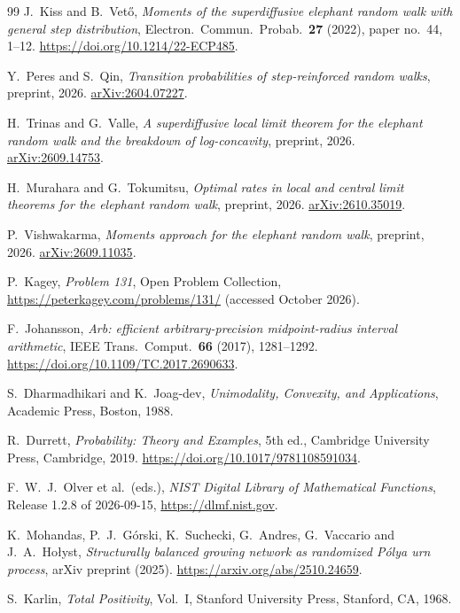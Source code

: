 \begin{thebibliography}{99}
J.~Kiss and B.~Vet\H{o}, \emph{Moments of the superdiffusive elephant
random walk with general step distribution}, Electron.\ Commun.\ Probab.\
\textbf{27} (2022), paper no.~44, 1--12.
\url{https://doi.org/10.1214/22-ECP485}.

Y.~Peres and S.~Qin, \emph{Transition probabilities of step-reinforced
random walks}, preprint, 2026.
\href{https://arxiv.org/abs/2604.07227}{arXiv:2604.07227}.

H.~Trinas and G.~Valle, \emph{A superdiffusive local limit theorem for the
elephant random walk and the breakdown of log-concavity}, preprint, 2026.
\href{https://arxiv.org/abs/2609.14753}{arXiv:2609.14753}.

H.~Murahara and G.~Tokumitsu, \emph{Optimal rates in local and central limit
theorems for the elephant random walk}, preprint, 2026.
\href{https://arxiv.org/abs/2610.35019}{arXiv:2610.35019}.

P.~Vishwakarma, \emph{Moments approach for the elephant random walk},
preprint, 2026.
\href{https://arxiv.org/abs/2609.11035}{arXiv:2609.11035}.

P.~Kagey, \emph{Problem 131}, Open Problem Collection,
\url{https://peterkagey.com/problems/131/} (accessed October 2026).

F.~Johansson, \emph{Arb: efficient arbitrary-precision midpoint-radius
interval arithmetic}, IEEE Trans.\ Comput.\ \textbf{66} (2017), 1281--1292.
\url{https://doi.org/10.1109/TC.2017.2690633}.

S.~Dharmadhikari and K.~Joag-dev, \emph{Unimodality, Convexity, and
Applications}, Academic Press, Boston, 1988.

R.~Durrett, \emph{Probability: Theory and Examples}, 5th ed., Cambridge University
Press, Cambridge, 2019.
\url{https://doi.org/10.1017/9781108591034}.

F.~W.~J.~Olver et al.\ (eds.), \emph{NIST Digital Library of Mathematical
Functions}, Release 1.2.8 of 2026-09-15, \url{https://dlmf.nist.gov}.

K.~Mohandas, P.~J.~G\'orski, K.~Suchecki, G.~Andres, G.~Vaccario and J.~A.~Ho{\l}yst,
\emph{Structurally balanced growing network as randomized P\'olya urn process},
arXiv preprint (2025).
\url{https://arxiv.org/abs/2510.24659}.

S.~Karlin, \emph{Total Positivity}, Vol.~I, Stanford University Press,
Stanford, CA, 1968.


\end{thebibliography}
